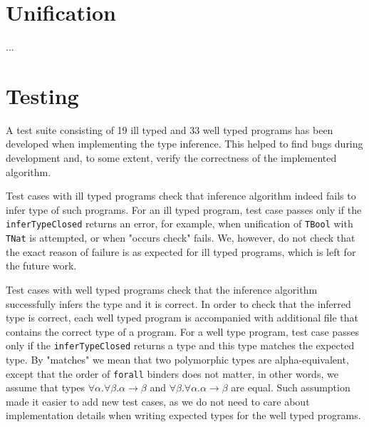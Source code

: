 
\section{Unification}

...


\section{Testing}

A test suite consisting of 19 ill typed and 33 well typed programs has been developed when implementing the type inference. This helped to find bugs during development and, to some extent, verify the correctness of the implemented algorithm.

Test cases with ill typed programs check that inference algorithm indeed fails to infer type of such programs. For an ill typed program, test case passes only if the \texttt{inferTypeClosed} returns an error, for example, when unification of \texttt{TBool} with \texttt{TNat} is attempted, or when "occurs check" fails. We, however, do not check that the exact reason of failure is as expected for ill typed programs, which is left for the future work.

Test cases with well typed programs check that the inference algorithm successfully infers the type and it is correct. In order to check that the inferred type is correct, each well typed program is accompanied with additional file that contains the correct type of a program. For a well type program, test case passes only if the \texttt{inferTypeClosed} returns a type and this type matches the expected type. By "matches" we mean that two polymorphic types are alpha-equivalent, except that the order of \texttt{forall} binders does not matter, in other words, we assume that types $\forall \alpha. \forall \beta. \alpha \to \beta$ and $\forall \beta. \forall \alpha. \alpha \to \beta$ are equal. Such assumption made it easier to add new test cases, as we do not need to care about implementation details when writing expected types for the well typed programs.

